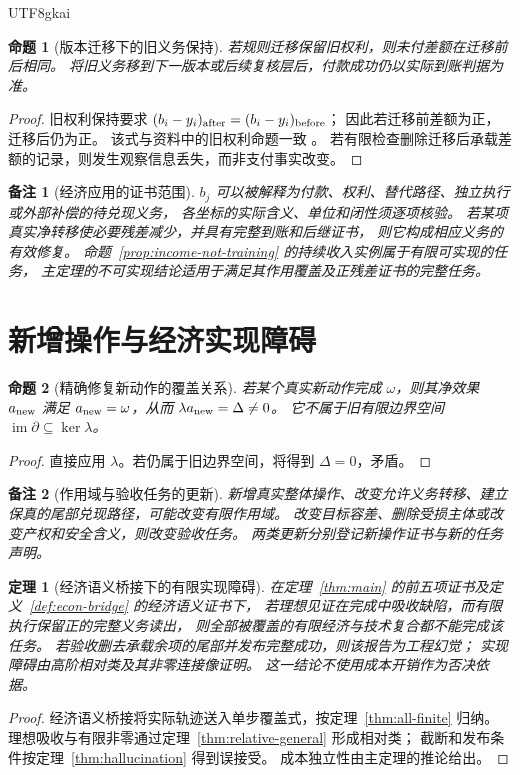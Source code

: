 \documentclass[12pt,a4paper,openany]{report}
\newtheorem{theorem}{定理}[chapter]
\newtheorem{proposition}{命题}[chapter]
\newtheorem{remark}{备注}[chapter]
\numberwithin{equation}{chapter}
\newcommand{\im}{\operatorname{im}}
\begin{document}
\begin{CJK*}{UTF8}{gkai}
\begin{proposition}[版本迁移下的旧义务保持]
若规则迁移保留旧权利，则未付差额在迁移前后相同。
将旧义务移到下一版本或后续复核层后，付款成功仍以实际到账判据为准。
\end{proposition}
\begin{proof}
旧权利保持要求
$(b_i-y_i)_{\rm after}=(b_i-y_i)_{\rm before}$；
因此若迁移前差额为正，迁移后仍为正。
该式与资料中的旧权利命题一致
\cite[《偏好多样性、权利边界与可兑现分配》，命题“规则更新不能自动消灭旧权利”]{SourcePreference}。
若有限检查删除迁移后承载差额的记录，则发生观察信息丢失，而非支付事实改变。
\end{proof}

\begin{remark}[经济应用的证书范围]
$b_j$ 可以被解释为付款、权利、替代路径、独立执行或外部补偿的待兑现义务，
各坐标的实际含义、单位和闭性须逐项核验。
若某项真实净转移使必要残差减少，并具有完整到账和后继证书，
则它构成相应义务的有效修复。
命题~\ref{prop:income-not-training} 的持续收入实例属于有限可实现的任务，
主定理的不可实现结论适用于满足其作用覆盖及正残差证书的完整任务。
\end{remark}

\section{新增操作与经济实现障碍}

\begin{proposition}[精确修复新动作的覆盖关系]
若某个真实新动作完成 $\omega$，则其净效果 $a_{\rm new}$ 满足
$a_{\rm new}=\omega$，从而 $\lambda a_{\rm new}=\Delta\ne0$。
它不属于旧有限边界空间 $\im\partial\subseteq\ker\lambda$。
\end{proposition}
\begin{proof}
直接应用 $\lambda$。若仍属于旧边界空间，将得到 $\Delta=0$，矛盾。
\end{proof}

\begin{remark}[作用域与验收任务的更新]
新增真实整体操作、改变允许义务转移、建立保真的尾部兑现路径，可能改变有限作用域。
改变目标容差、删除受损主体或改变产权和安全含义，则改变验收任务。
两类更新分别登记新操作证书与新的任务声明。
\end{remark}

\begin{theorem}[经济语义桥接下的有限实现障碍]
在定理~\ref{thm:main} 的前五项证书及定义~\ref{def:econ-bridge} 的经济语义证书下，
若理想见证在完成中吸收缺陷，而有限执行保留正的完整义务读出，
则全部被覆盖的有限经济与技术复合都不能完成该任务。
若验收删去承载余项的尾部并发布完整成功，则该报告为工程幻觉；
实现障碍由高阶相对类及其非零连接像证明。
这一结论不使用成本开销作为否决依据。
\end{theorem}
\begin{proof}
经济语义桥接将实际轨迹送入单步覆盖式，按定理~\ref{thm:all-finite} 归纳。
理想吸收与有限非零通过定理~\ref{thm:relative-general} 形成相对类；
截断和发布条件按定理~\ref{thm:hallucination} 得到误接受。
成本独立性由主定理的推论给出。
\end{proof}


\end{CJK*}
\end{document}
